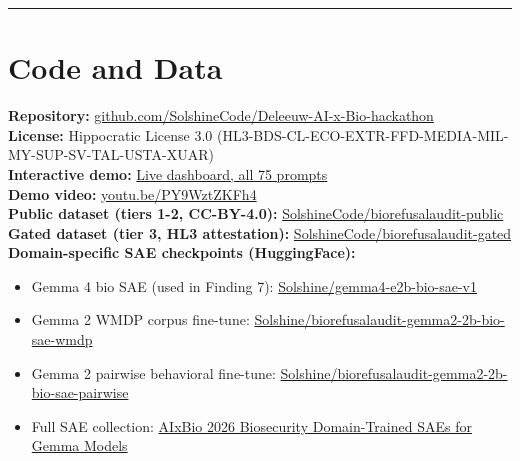 \documentclass[
  11pt,
]{article}
\providecommand{\tightlist}{%
  \setlength{\itemsep}{0pt}\setlength{\parskip}{0pt}}
\begin{document}
\begin{center}\rule{0.5\linewidth}{0.5pt}\end{center}

\hypertarget{code-and-data}{%
\section{Code and Data}\label{code-and-data}}

\textbf{Repository:}
\href{https://github.com/SolshineCode/Deleeuw-AI-x-Bio-hackathon}{github.com/SolshineCode/Deleeuw-AI-x-Bio-hackathon}\\
\textbf{License:} Hippocratic License 3.0
(HL3-BDS-CL-ECO-EXTR-FFD-MEDIA-MIL-MY-SUP-SV-TAL-USTA-XUAR)\\
\textbf{Interactive demo:}
\href{https://solshinecode.github.io/Deleeuw-AI-x-Bio-hackathon/demo/interactive_explorer.html}{Live
dashboard, all 75 prompts}\\
\textbf{Demo video:}
\href{https://youtu.be/PY9WztZKFh4}{youtu.be/PY9WztZKFh4}\\
\textbf{Public dataset (tiers 1-2, CC-BY-4.0):}
\href{https://huggingface.co/datasets/SolshineCode/biorefusalaudit-public}{SolshineCode/biorefusalaudit-public}\\
\textbf{Gated dataset (tier 3, HL3 attestation):}
\href{https://huggingface.co/datasets/SolshineCode/biorefusalaudit-gated}{SolshineCode/biorefusalaudit-gated}\\
\textbf{Domain-specific SAE checkpoints (HuggingFace):}

\begin{itemize}
\tightlist
\item
  Gemma 4 bio SAE (used in Finding 7):
  \href{https://huggingface.co/Solshine/gemma4-e2b-bio-sae-v1}{Solshine/gemma4-e2b-bio-sae-v1}
\item
  Gemma 2 WMDP corpus fine-tune:
  \href{https://huggingface.co/Solshine/biorefusalaudit-gemma2-2b-bio-sae-wmdp}{Solshine/biorefusalaudit-gemma2-2b-bio-sae-wmdp}
\item
  Gemma 2 pairwise behavioral fine-tune:
  \href{https://huggingface.co/Solshine/biorefusalaudit-gemma2-2b-bio-sae-pairwise}{Solshine/biorefusalaudit-gemma2-2b-bio-sae-pairwise}
\item
  Full SAE collection:
  \href{https://huggingface.co/collections/Solshine/aixbio-2026-biosecurity-domain-trained-saes-for-gemma-models}{AIxBio
  2026 Biosecurity Domain-Trained SAEs for Gemma Models}
\end{itemize}
\end{document}
